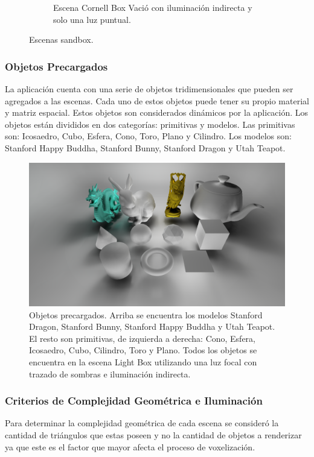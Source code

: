 \begin{figure}[H]
\begin{subfigure}[t]{0.32\textwidth}
		\caption*{Escena Cornell Box Vació con iluminación indirecta y solo una luz puntual.}
	\end{subfigure}
	\caption{Escenas sandbox.}
	\label{fig:sandboxscenes}
\end{figure}

\subsubsection{Objetos Precargados}
La aplicación cuenta con una serie de objetos tridimensionales que pueden ser agregados a las escenas. Cada uno de estos objetos puede tener su propio material y matriz espacial. Estos objetos son considerados dinámicos por la aplicación. Los objetos están divididos en dos categorías: primitivas y modelos. Las primitivas son: Icosaedro, Cubo, Esfera, Cono, Toro, Plano y Cilindro. Los modelos son: Stanford Happy Buddha, Stanford Bunny, Stanford Dragon y Utah Teapot.

\begin{figure}[H]
	\centering
	\includegraphics[width=0.95\linewidth]{media/scenes/models.png}
	\caption{Objetos precargados. Arriba se encuentra los modelos Stanford Dragon, Stanford Bunny, Stanford Happy Buddha y Utah Teapot. El resto son primitivas, de izquierda a derecha: Cono, Esfera, Icosaedro, Cubo, Cilindro, Toro y Plano. Todos los objetos se encuentra en la escena Light Box utilizando una luz focal con trazado de sombras e iluminación indirecta.}
	\label{fig:models}
\end{figure}

\subsubsection{Criterios de Complejidad Geométrica e Iluminación}

Para determinar la complejidad geométrica de cada escena se consideró la cantidad de triángulos que estas poseen y no la cantidad de objetos a renderizar ya que este es el factor que mayor afecta el proceso de voxelización.

